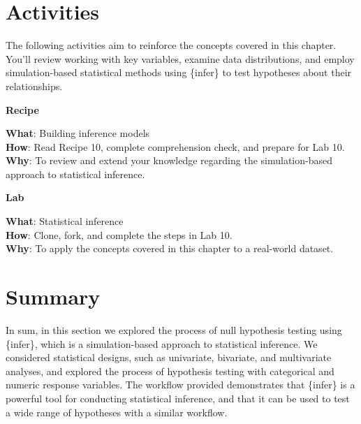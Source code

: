 \documentclass[
  letterpaper,
  krantz1]{latex/krantz-mod}
\theoremstyle{definition}
\theoremstyle{definition}
\theoremstyle{remark}
\begin{document}
\section*{Activities}\label{activities-8}


The following activities aim to reinforce the concepts covered in this
chapter. You'll review working with key variables, examine data
distributions, and employ simulation-based statistical methods using
\{infer\} to test hypotheses about their relationships.

\begin{tcolorbox}[enhanced jigsaw, toprule=.15mm, breakable, colback=white, arc=.35mm, left=2mm, colframe=quarto-callout-color-frame, opacityback=0, bottomrule=.15mm, rightrule=.15mm, leftrule=.75mm]

\textbf{ Recipe}

\textbf{What}: Building inference models\\
\textbf{How}: Read Recipe 10, complete comprehension check, and prepare
for Lab 10.\\
\textbf{Why}: To review and extend your knowledge regarding the
simulation-based approach to statistical inference.

\end{tcolorbox}

\begin{tcolorbox}[enhanced jigsaw, toprule=.15mm, breakable, colback=white, arc=.35mm, left=2mm, colframe=quarto-callout-color-frame, opacityback=0, bottomrule=.15mm, rightrule=.15mm, leftrule=.75mm]

\textbf{ Lab}

\textbf{What}: Statistical inference\\
\textbf{How}: Clone, fork, and complete the steps in Lab 10.\\
\textbf{Why}: To apply the concepts covered in this chapter to a
real-world dataset.

\end{tcolorbox}

\section*{Summary}\label{summary-9}


In sum, in this section we explored the process of null hypothesis
testing using \{infer\}, which is a simulation-based approach to
statistical inference. We considered statistical designs, such as
univariate, bivariate, and multivariate analyses, and explored the
process of hypothesis testing with categorical and numeric response
variables. The workflow provided demonstrates that \{infer\} is a
powerful tool for conducting statistical inference, and that it can be
used to test a wide range of hypotheses with a similar workflow.
\end{document}
